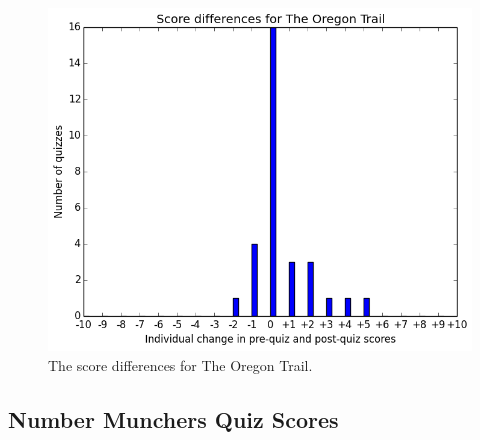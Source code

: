 			\begin{figure}[] 
			\centering 
			\includegraphics[width=\textwidth]{oregon_results.png} 
			\caption{The score differences for The Oregon Trail.}
			\end{figure}

			\clearpage

		\subsection{Number Munchers Quiz Scores}

